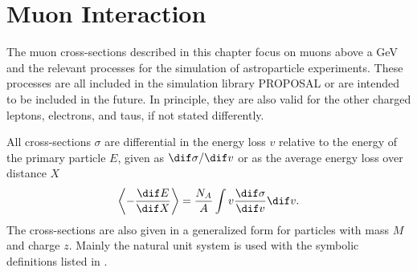 \chapter{Muon Interaction} \label{sec:interactions}

The muon cross-sections described in this chapter focus on muons above a GeV and the relevant processes for the simulation of astroparticle experiments.
These processes are all included in the simulation library PROPOSAL or are intended to be included in the future.
In principle, they are also valid for the other charged leptons, electrons, and taus, if not stated differently.

All cross-sections $\sigma$ are differential in the energy loss $v$ relative to the energy of the primary particle $E$, given as $\dif \sigma / \dif v$ or as the average energy loss over distance $X$
\begin{align} \label{eq:dedx_int}
    \left\langle - \frac{\dif E}{\dif X} \right\rangle = \frac{N_A}{A} \int v \frac{\dif \sigma}{\dif v} \dif v.
\end{align}
The cross-sections are also given in a generalized form for particles with mass $M$ and charge $z$.
Mainly the natural unit system is used with the symbolic definitions listed in .
